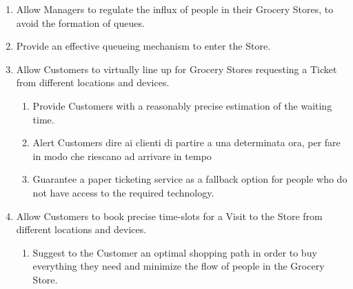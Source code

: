 \documentclass[a4paper, 10pt, oneside]{article}
\newcommand*{\lorenzo}[1]{\textcolor{BurntOrange}{#1}}
\begin{document}
\begin{enumerate}[label={G.\arabic{*}}]
    \item \label{goal:influx} Allow Managers to regulate the influx of people in their Grocery Stores, to avoid the formation of queues.
    \item \label{goal:effectiveQueue} Provide an effective queueing mechanism to enter the Store.
    \item \label{goal:enqueue} Allow Customers to virtually line up for Grocery Stores requesting a Ticket from different locations and devices.
    \begin{enumerate}[label={\ref{goal:enqueue}.\arabic{*}}]
        \item \label{goal:enque:time} Provide Customers with a reasonably precise estimation of the waiting time.
        \item \label{goal:enque:alert} Alert Customers \lorenzo{dire ai clienti di partire a una determinata ora, per fare in modo che riescano ad arrivare in tempo} %
        \item \label{goal:enque:fallback} Guarantee a paper ticketing service as a fallback option for people who do not have access to the required technology.
    \end{enumerate}
    \item \label{goal:visit} Allow Customers to book precise time-slots for a Visit to the Store from different locations and devices.
    \begin{enumerate}[label={\ref{goal:visit}.\arabic{*}}]
        \item \label{goal:visit:path} Suggest to the Customer an optimal shopping path in order to buy everything they need and minimize the flow of people in the Grocery Store.

\end{enumerate}
\end{enumerate}
\end{document}

